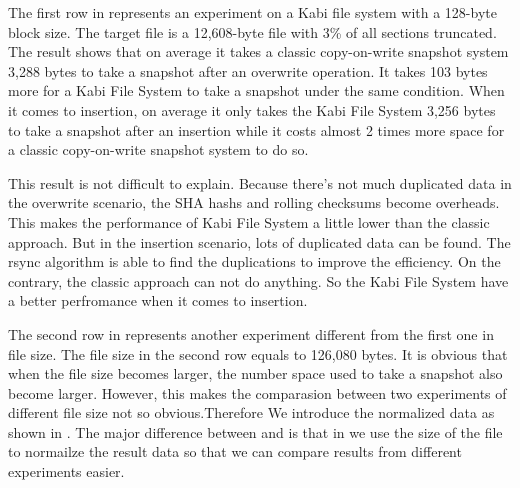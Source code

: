     The first row in  represents an experiment on a Kabi file system with a 128-byte block size. The target file is a 12,608-byte file with 3\% of all sections truncated. The result shows that on average it takes a classic copy-on-write snapshot system 3,288 bytes to take a snapshot after an overwrite operation. It takes 103 bytes more for a Kabi File System to take a snapshot under the same condition. When it comes to insertion, on average it only takes the Kabi File System 3,256 bytes to take a snapshot after an insertion while it costs almost 2 times more space for a classic copy-on-write snapshot system to do so.

    This result is not difficult to explain. Because there's not much duplicated data in the overwrite scenario, the SHA hashs and rolling checksums become overheads. This makes the performance of Kabi File System a little lower than the classic approach. But in the insertion scenario, lots of duplicated data can be found. The rsync algorithm is able to find the duplications to improve the efficiency. On the contrary, the classic approach can not do anything. So the Kabi File System have a better perfromance  when it comes to insertion.
    
    The second row in  represents another experiment different from the first one in file size. The file size in the second row equals to 126,080 bytes. It is obvious that when the file size becomes larger, the number space used to take a snapshot also become larger. However, this makes the comparasion between two experiments of different file size not so obvious.Therefore We introduce the normalized data as shown in . The major difference between  and  is that in  we use the size of the file to normailze the result data so that we can compare results from different experiments easier.

